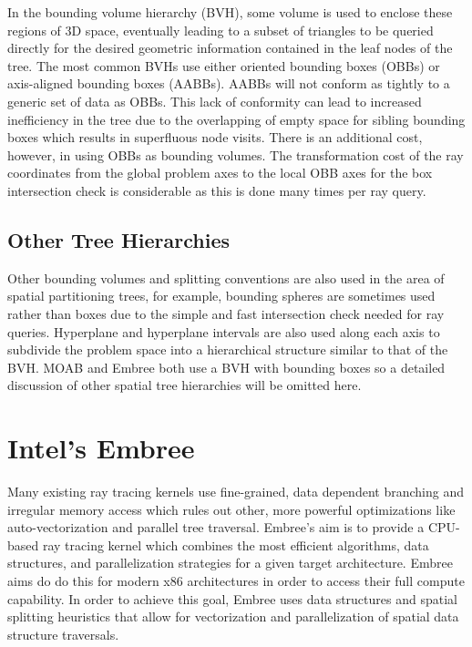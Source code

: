 \documentclass{anstrans}
\begin{document}
In the bounding volume hierarchy (BVH), some volume is used to enclose these regions of 3D space, eventually leading to a subset of triangles to be queried directly for the desired geometric information contained in the leaf nodes of the tree. The most common BVHs use either oriented bounding boxes (OBBs) or axis-aligned bounding boxes (AABBs). AABBs will not conform as tightly to a generic set of data as OBBs. This lack of conformity can lead to increased inefficiency in the tree due to the overlapping of empty space for sibling bounding boxes which results in superfluous node visits. There is an additional cost, however, in using OBBs as bounding volumes. The transformation cost of the ray coordinates from the global problem axes to the local OBB axes for the box intersection check is considerable as this is done many times per ray query. 

\subsection{Other Tree Hierarchies} 

Other bounding volumes and splitting conventions are also used in the area of spatial partitioning trees, for example, bounding spheres are sometimes used rather than boxes due to the simple and fast intersection check needed for ray queries. Hyperplane and hyperplane intervals are also used along each axis to subdivide the problem space into a hierarchical structure similar to that of the BVH. MOAB and Embree both use a BVH with bounding boxes so a detailed discussion of other spatial tree hierarchies will be omitted here.

\section{Intel's Embree}

Many existing ray tracing kernels use fine-grained, data dependent branching and irregular memory access which rules out other, more powerful optimizations like auto-vectorization and parallel tree traversal. Embree's aim is to provide a CPU-based ray tracing kernel which combines the most efficient algorithms, data structures, and parallelization strategies for a given target architecture. Embree aims do do this for modern x86 architectures in order to access their full compute capability. In order to achieve this goal, Embree uses data structures and spatial splitting heuristics that allow for vectorization and parallelization of spatial data structure traversals.
\end{document}
